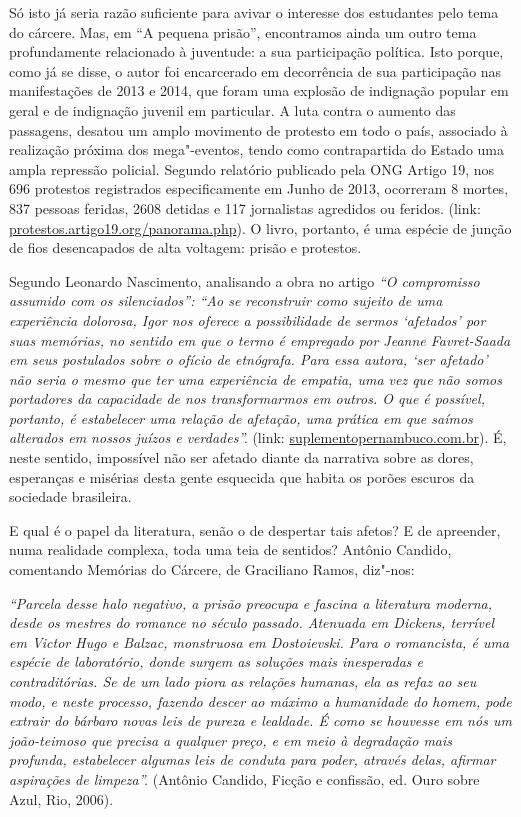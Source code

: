 \documentclass[11pt]{extarticle}
\begin{document}
Só isto já seria razão suficiente para avivar o interesse dos estudantes
pelo tema do cárcere. Mas, em ``A pequena prisão'', encontramos ainda um
outro tema profundamente relacionado à juventude: a sua participação
política. Isto porque, como já se disse, o autor foi encarcerado em
decorrência de sua participação nas manifestações de 2013 e 2014, que
foram uma explosão de indignação popular em geral e de indignação
juvenil em particular. A luta contra o aumento das passagens, desatou um
amplo movimento de protesto em todo o país, associado à realização
próxima dos mega"-eventos, tendo como contrapartida do Estado uma ampla
repressão policial. Segundo relatório publicado pela ONG Artigo 19, nos
696 protestos registrados especificamente em Junho de 2013, ocorreram 8
mortes, 837 pessoas feridas, 2608 detidas e 117 jornalistas agredidos ou
feridos. (link: \url{protestos.artigo19.org/panorama.php}). O livro, portanto,
é uma espécie de junção de fios desencapados de alta voltagem: prisão e
protestos.

Segundo Leonardo Nascimento, analisando a obra no artigo \emph{``O
compromisso assumido com os silenciados'': ``Ao se reconstruir como
sujeito de uma experiência dolorosa, Igor nos oferece a possibilidade de
sermos `afetados' por suas memórias, no sentido em que o termo é
empregado por Jeanne Favret-Saada em seus postulados sobre o ofício de
etnógrafa. Para essa autora, `ser afetado' não seria o mesmo que ter uma
experiência de empatia, uma vez que não somos portadores da capacidade
de nos transformarmos em outros. O que é possível, portanto, é
estabelecer uma relação de afetação, uma prática em que saímos alterados
em nossos juízos e verdades''.} (link:
\href{https://suplementopernambuco.com.br/artigos/2032-o-compromisso-assumido-com-os-silenciados.html}{suplementopernambuco.com.br}).
É, neste sentido, impossível não ser afetado diante da narrativa sobre
as dores, esperanças e misérias desta gente esquecida que habita os
porões escuros da sociedade brasileira.

E qual é o papel da literatura, senão o de despertar tais afetos? E de
apreender, numa realidade complexa, toda uma teia de sentidos? Antônio
Candido, comentando Memórias do Cárcere, de Graciliano Ramos, diz"-nos:

\emph{``Parcela desse halo negativo, a prisão preocupa e fascina a
literatura moderna, desde os mestres do romance no século passado.
Atenuada em Dickens, terrível em Victor Hugo e Balzac, monstruosa em
Dostoievski. Para o romancista, é uma espécie de laboratório, donde
surgem as soluções mais inesperadas e contraditórias. Se de um lado
piora as relações humanas, ela as refaz ao seu modo, e neste processo,
fazendo descer ao máximo a humanidade do homem, pode extrair do bárbaro
novas leis de pureza e lealdade. É como se houvesse em nós um
joão-teimoso que precisa a qualquer preço, e em meio à degradação mais
profunda, estabelecer algumas leis de conduta para poder, através delas,
afirmar aspirações de limpeza''.} (Antônio Candido, Ficção e confissão,
ed. Ouro sobre Azul, Rio, 2006).
\end{document}
